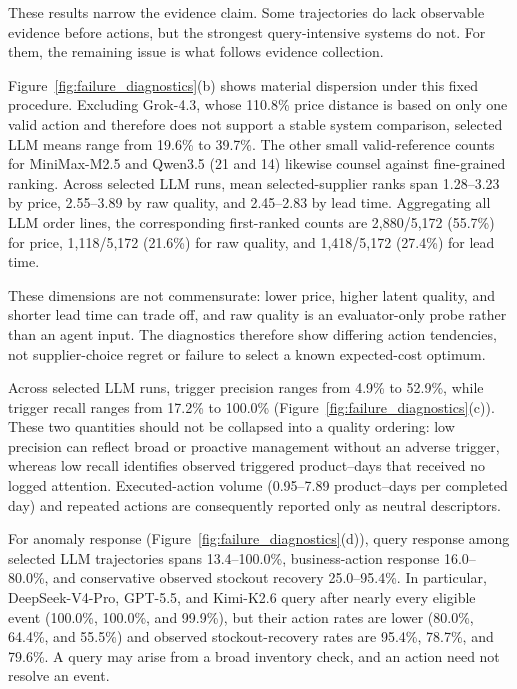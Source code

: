 These results narrow the evidence claim. Some trajectories do lack observable evidence before actions, but the strongest query-intensive systems do not. For them, the remaining issue is what follows evidence collection.

Figure~\ref{fig:failure_diagnostics}(b) shows material dispersion under this fixed procedure. Excluding Grok-4.3, whose 110.8\% price distance is based on only one valid action and therefore does not support a stable system comparison, selected LLM means range from 19.6\% to 39.7\%. The other small valid-reference counts for MiniMax-M2.5 and Qwen3.5 (21 and 14) likewise counsel against fine-grained ranking. Across selected LLM runs, mean selected-supplier ranks span 1.28--3.23 by price, 2.55--3.89 by raw quality, and 2.45--2.83 by lead time. Aggregating all LLM order lines, the corresponding first-ranked counts are 2,880/5,172 (55.7\%) for price, 1,118/5,172 (21.6\%) for raw quality, and 1,418/5,172 (27.4\%) for lead time.

These dimensions are not commensurate: lower price, higher latent quality, and shorter lead time can trade off, and raw quality is an evaluator-only probe rather than an agent input. The diagnostics therefore show differing action tendencies, not supplier-choice regret or failure to select a known expected-cost optimum.

Across selected LLM runs, trigger precision ranges from 4.9\% to 52.9\%, while trigger recall ranges from 17.2\% to 100.0\% (Figure~\ref{fig:failure_diagnostics}(c)). These two quantities should not be collapsed into a quality ordering: low precision can reflect broad or proactive management without an adverse trigger, whereas low recall identifies observed triggered product--days that received no logged attention. Executed-action volume (0.95--7.89 product--days per completed day) and repeated actions are consequently reported only as neutral descriptors.

For anomaly response (Figure~\ref{fig:failure_diagnostics}(d)), query response among selected LLM trajectories spans 13.4--100.0\%, business-action response 16.0--80.0\%, and conservative observed stockout recovery 25.0--95.4\%. In particular, DeepSeek-V4-Pro, GPT-5.5, and Kimi-K2.6 query after nearly every eligible event (100.0\%, 100.0\%, and 99.9\%), but their action rates are lower (80.0\%, 64.4\%, and 55.5\%) and observed stockout-recovery rates are 95.4\%, 78.7\%, and 79.6\%. A query may arise from a broad inventory check, and an action need not resolve an event.

